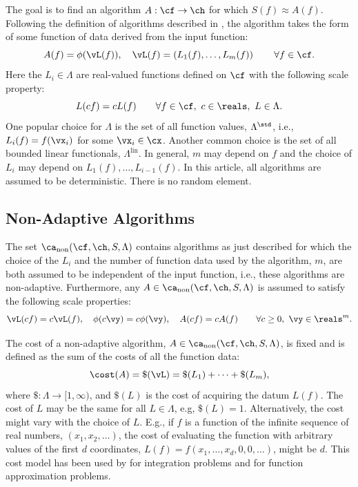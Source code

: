 \documentclass[]{elsarticle}
\DeclareMathOperator{\lin}{lin}
\DeclareMathOperator{\fix}{non}
\theoremstyle{definition}
\theoremstyle{remark}
\begin{document}
The goal is to find an algorithm $A:\cf \to \ch$ for which $S(f) \approx A(f)$. Following the definition of algorithms described in \cite[Section 3.2]{TraWasWoz88}, the algorithm takes the form of some function of data derived from the input function:
\begin{equation}
\label{algoform}
A(f) =  \phi(\vL(f)), \quad \vL(f) = \left(L_1(f), \ldots, L_m(f)\right) \qquad \forall f \in \cf.
\end{equation}
Here the $L_i \in \Lambda$ are real-valued functions defined on $\cf$ with the following scale property:
\begin{equation}
\label{dataassump}
L(cf) = cL(f) \qquad \forall f \in \cf, \ c \in \reals, \ L \in \Lambda.
\end{equation}
One popular choice for $\Lambda$ is the set of all function values, $\Lambda^{\std}$, i.e., $L_i(f) = f(\vx_i)$ for some $\vx_i \in \cx$.  Another common choice is the set of all bounded linear functionals, $\Lambda^{\lin}$.  In general, $m$ may depend on $f$ and the choice of $L_i$ may depend on $L_1(f), \ldots, L_{i-1}(f)$.  In this article, all algorithms are assumed to be deterministic.  There is no random element.

\subsection{Non-Adaptive Algorithms} \label{NonAdaptsec}

The set $\ca_{\fix}(\cf,\ch,S,\Lambda)$ contains algorithms as just described for which the choice of the $L_i$ and the number of function data used by the algorithm, $m$, are both assumed to be independent of the input function, i.e., these algorithms are non-adaptive.  Furthermore, any $A \in \ca_{\fix}(\cf,\ch,S,\Lambda)$ is assumed to satisfy the following scale properties:
\begin{equation}
\label{algoscale}
\vL(cf) = c \vL(f), \quad 
\phi(c\vy) = c\phi(\vy), \quad A(cf) = cA(f) \qquad \forall c \ge 0, \ \vy \in \reals^m.
\end{equation}

The cost of a non-adaptive algorithm, $A \in  \ca_{\fix}(\cf,\ch,S,\Lambda)$, is fixed and is defined as the sum of the costs of all the function data:
\begin{equation} \label{costfix}
\cost(A) = \$(\vL) = \$(L_1) + \cdots +\$(L_m),
\end{equation}
where $\$:\Lambda \to [1,\infty)$, and $\$(L)$ is the cost of acquiring the datum $L(f)$. The cost of $L$ may be the same for all $L \in \Lambda$, e.g, $\$(L)=1$.  Alternatively, the cost might vary with the choice of $L$.  E.g., if $f$ is a function of the infinite sequence of real numbers, $(x_1, x_2, \ldots)$, the cost of evaluating the function with arbitrary values of the first $d$ coordinates, $L(f)=f(x_1, \ldots, x_d, 0, 0, \ldots)$, might be $d$.  This cost model has been used by \cite{HicMGRitNiu09a,KuoEtal10a,NiuHic09a,NiuHic09b,PlaWas11a} for integration problems and \cite{Was13a,WasWoz11a,WasWoz11b} for function approximation problems.
\end{document}
